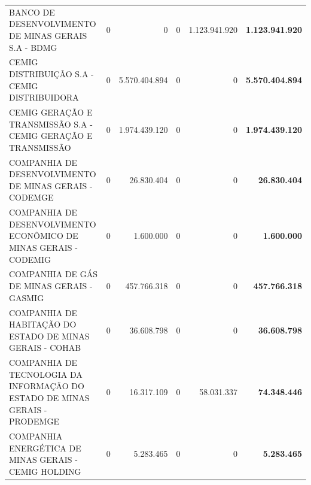 \documentclass{article}
\begin{document}
\begin{longtable}[c]{m{5.5cm}|m{2.5cm}|m{2.5cm}|m{2.5cm}|m{2cm}|m{2cm}}
\multicolumn{1}{L{5.5cm}|}{BANCO DE DESENVOLVIMENTO DE MINAS GERAIS S.A - BDMG} & \multicolumn{1}{r|}{    0} & \multicolumn{1}{r|}{            0} & \multicolumn{1}{r|}{0} & \multicolumn{1}{r|}{1.123.941.920} & \multicolumn{1}{r}{ \textbf{1.123.941.920}} \\
\multicolumn{1}{L{5.5cm}|}{CEMIG DISTRIBUIÇÃO S.A - CEMIG DISTRIBUIDORA} & \multicolumn{1}{r|}{    0} & \multicolumn{1}{r|}{5.570.404.894} & \multicolumn{1}{r|}{0} & \multicolumn{1}{r|}{            0} & \multicolumn{1}{r}{ \textbf{5.570.404.894}} \\
\multicolumn{1}{L{5.5cm}|}{CEMIG GERAÇÃO E TRANSMISSÃO S.A - CEMIG GERAÇÃO E TRANSMISSÃO} & \multicolumn{1}{r|}{    0} & \multicolumn{1}{r|}{1.974.439.120} & \multicolumn{1}{r|}{0} & \multicolumn{1}{r|}{            0} & \multicolumn{1}{r}{ \textbf{1.974.439.120}} \\
\multicolumn{1}{L{5.5cm}|}{COMPANHIA DE DESENVOLVIMENTO DE MINAS GERAIS - CODEMGE} & \multicolumn{1}{r|}{    0} & \multicolumn{1}{r|}{26.830.404} & \multicolumn{1}{r|}{0} & \multicolumn{1}{r|}{            0} & \multicolumn{1}{r}{ \textbf{26.830.404}} \\
\multicolumn{1}{L{5.5cm}|}{COMPANHIA DE DESENVOLVIMENTO ECONÔMICO DE MINAS GERAIS - CODEMIG} & \multicolumn{1}{r|}{    0} & \multicolumn{1}{r|}{1.600.000} & \multicolumn{1}{r|}{0} & \multicolumn{1}{r|}{            0} & \multicolumn{1}{r}{ \textbf{1.600.000}} \\
\multicolumn{1}{L{5.5cm}|}{COMPANHIA DE GÁS DE MINAS GERAIS - GASMIG} & \multicolumn{1}{r|}{    0} & \multicolumn{1}{r|}{457.766.318} & \multicolumn{1}{r|}{0} & \multicolumn{1}{r|}{            0} & \multicolumn{1}{r}{ \textbf{457.766.318}} \\
\multicolumn{1}{L{5.5cm}|}{COMPANHIA DE HABITAÇÃO DO ESTADO DE MINAS GERAIS - COHAB} & \multicolumn{1}{r|}{    0} & \multicolumn{1}{r|}{36.608.798} & \multicolumn{1}{r|}{0} & \multicolumn{1}{r|}{            0} & \multicolumn{1}{r}{ \textbf{36.608.798}} \\
\multicolumn{1}{L{5.5cm}|}{COMPANHIA DE TECNOLOGIA DA INFORMAÇÃO DO ESTADO DE MINAS GERAIS - PRODEMGE} & \multicolumn{1}{r|}{    0} & \multicolumn{1}{r|}{16.317.109} & \multicolumn{1}{r|}{0} & \multicolumn{1}{r|}{58.031.337} & \multicolumn{1}{r}{ \textbf{74.348.446}} \\
\multicolumn{1}{L{5.5cm}|}{COMPANHIA ENERGÉTICA DE MINAS GERAIS - CEMIG HOLDING} & \multicolumn{1}{r|}{    0} & \multicolumn{1}{r|}{5.283.465} & \multicolumn{1}{r|}{0} & \multicolumn{1}{r|}{            0} & \multicolumn{1}{r}{ \textbf{5.283.465}} \\

\end{longtable}
\end{document}

